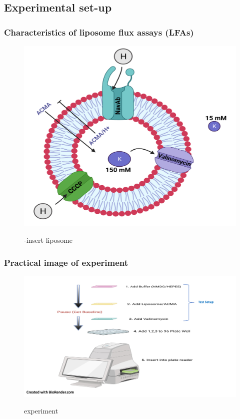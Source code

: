 \documentclass[10pt]{beamer}
\begin{document}
\subsection{Experimental set-up}
\begin{frame}
\label{Experimental set-up schematic}
\frametitle{Characteristics of liposome flux assays (LFAs)}
\begin{figure}
{\includegraphics[scale=0.6]{images/picture1.png}}
\caption{-insert liposome}
\end{figure}
\end{frame}

\begin{frame}
\label{Practical experimentation}
\frametitle{Practical image of experiment}
\begin{figure}
{\includegraphics[scale=0.3] {images/picture3.png}}
\caption{experiment}
\end{figure}
\end{frame}
\end{document}
